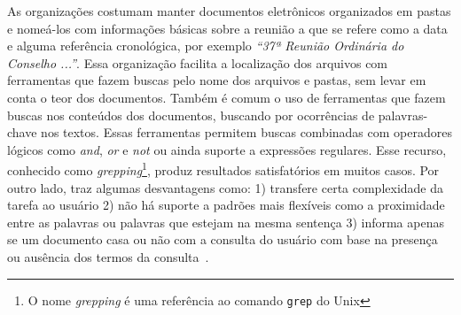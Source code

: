 As organizações costumam manter documentos eletrônicos organizados em pastas e nomeá-los com informações básicas sobre a reunião a que se refere como a data e alguma referência cronológica, por exemplo \textit{``37ª Reunião Ordinária do Conselho ...''}. Essa organização facilita a localização dos arquivos com ferramentas que fazem buscas pelo nome dos arquivos e pastas, sem levar em conta o teor dos documentos. 
%
Também é comum o uso de ferramentas que fazem buscas nos conteúdos dos documentos, buscando por ocorrências de palavras-chave nos textos. Essas ferramentas permitem buscas combinadas com operadores lógicos como \textit{and}, \textit{or} e \textit{not} ou ainda suporte a expressões regulares. Esse recurso, conhecido como \textit{grepping}\footnote{O nome \textit{grepping} é uma referência ao comando \texttt{grep} do Unix}, produz resultados satisfatórios em muitos casos. Por outro lado, traz algumas desvantagens como: 
1) transfere certa complexidade da tarefa ao usuário 
2) não há suporte a padrões mais flexíveis como a proximidade entre as palavras ou palavras que estejam na mesma sentença 
3) informa apenas se um documento casa ou não com a consulta do usuário com base na presença ou ausência dos termos da consulta~\cite{Aggarwal2012,Manning2008}. 
 

